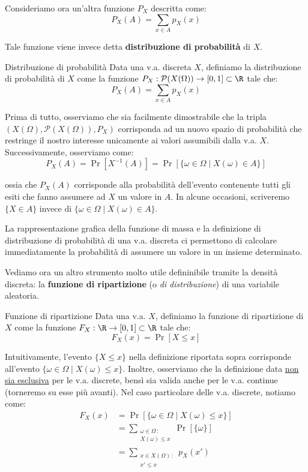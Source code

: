 \documentclass[a4paper, 12pt]{report}
\begin{document}
    
    Consideriamo ora un'altra funzione $P_X$ descritta come:
    \[P_X(A) = \sum_{x \in A} p_X(x)\]

    Tale funzione viene invece detta \textbf{distribuzione di probabilità} di $X$.
    
    \begin{frameddefn}{Distribuzione di probabilità}
        Data una v.a. discreta $X$, definiamo la distribuzione di probabilità di $X$ come la funzione $P_X : \mathcal{P}(X(\Omega)) \to [0,1] \subset \R$ tale che:
        \[P_X(A) = \sum_{x \in A} p_X(x)\]
    \end{frameddefn}
    
    Prima di tutto, osserviamo che sia facilmente dimostrabile che la tripla $(X(\Omega), \mathcal{P}(X(\Omega)), P_X)$ corrisponda ad un nuovo spazio di probabilità che restringe il nostro interesse unicamente ai valori assumibili dalla v.a. $X$. Successivamente, osserviamo come:
    \[P_X(A) = \Pr[X^{-1}(A)] = \Pr[\{\omega \in \Omega \mid X(\omega) \in A\}]\]

    ossia che $P_X(A)$ corrisponde alla probabilità dell'evento contenente tutti gli esiti che fanno assumere ad $X$ un valore in $A$. In alcune occasioni, scriveremo $\{X \in A\}$ invece di $\{\omega \in \Omega \mid X(\omega) \in A\}$.

    La rappresentazione grafica della funzione di massa e la definizione di distribuzione di probabilità di una v.a. discreta ci permettono di calcolare immediatamente la probabilità di assumere un valore in un insieme determinato.

    Vediamo ora un altro strumento molto utile defininibile tramite la densità discreta: la \textbf{funzione di ripartizione} (o \textit{di distribuzione}) di una variabile aleatoria.
    
    \begin{frameddefn}{Funzione di ripartizione}
        Data una v.a. $X$, definiamo la funzione di ripartizione di $X$ come la funzione $F_X : \R \to [0,1] \subset \R$ tale che:
        \[F_X(x) = \Pr[X \leq x]\]
    \end{frameddefn}
    
    Intuitivamente, l'evento $\{X \leq x\}$ nella definizione riportata sopra corrisponde all'evento $\{\omega \in \Omega \mid X(\omega) \leq x\}$. Inoltre, osserviamo che la definizione data \underline{non sia esclusiva} per le v.a. discrete, bensì sia valida anche per le v.a. continue (torneremo su esse più avanti). Nel caso particolare delle v.a. discrete, notiamo come:
    \[\begin{split}
        F_X(x) &= \Pr[\{\omega \in \Omega \mid X(\omega) \leq x\}] \\
        &= \sum_{\substack{\omega \in \Omega \,:\\ X(\omega) \leq x}} \Pr[\{\omega\}] \\
        &= \sum_{\substack{x \in X(\Omega) \,:\\ x' \leq x}} p_X(x')
    \end{split}\]
\end{document}
